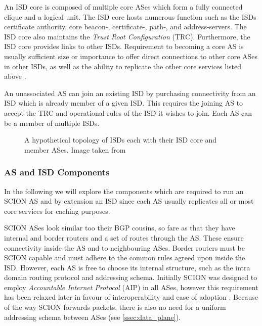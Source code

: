 \documentclass[../eva1_scion.tex]{subfiles}
\begin{document}
    An ISD core is composed of multiple core ASes which form a fully connected clique and a logical unit. The ISD core hosts numerous function such as the ISDs certificate authority, core beacon-, certificate-, path-, and address-servers. The ISD core also maintains the \textit{Trust Root Configuration} (TRC). Furthermore, the ISD core  provides links to other ISDs.  Requirement to becoming a core AS is usually sufficient size or importance to offer direct connections to other core ASes in other ISDs, as well as the ability to replicate the other core services listed above \cite{scion_2011}.

    An unassociated AS can join an existing ISD by purchasing connectivity from an ISD which is already member of a given ISD. This requires the joining AS to accept the TRC and operational rules of the ISD it wishes to join. Each AS can be a member of multiple ISDs.

    \begin{figure}[ht]
        \centering
        \caption{A hypothetical topology of ISDs each with their ISD core and member ASes. Image taken from \cite{scion_2017}}%
        \label{fig:isd_topology}
    \end{figure}
    \subsubsection{AS and ISD Components} \label{sssec:as_componants}

    In the following we will explore the components which are required to run an SCION AS and by extension an ISD since each AS usually replicates all or most core services for caching purposes.

    SCION ASes look similar too their BGP cousins, so fare as that they have internal and border routers and a set of routes through the AS. These ensure connectivity inside the AS and to neighbouring ASes. Border routers must be SCION capable and must adhere to the common rules agreed upon inside the ISD. However, each AS is free to choose its internal structure, such as the intra domain routing protocol and addressing schema. Initially SCION was designed to employ \textit{Accountable Internet Protocol} (AIP) \cite{scion_2011, aip_2008} in all ASes, however this requirement has been relaxed later in favour of interoperability and ease of adoption \cite{scion_2015}. Because of the way SCION forwards packets, there is also no need for a uniform addressing schema between ASes (see \ref{ssec:data_plane}).
\end{document}

